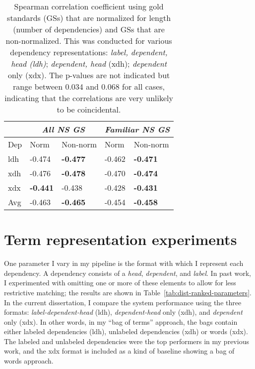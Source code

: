 \begin{table}[htb!]
\begin{center}
\begin{tabular}{|l||l|l||l|l|}
\hline
 & \multicolumn{2}{|c||}{\textit{All NS GS}} & \multicolumn{2}{|c|}{\textit{Familiar NS GS}} \\
\hline
 Dep & Norm & Non-norm & Norm & Non-norm \\
\hline
\hline
ldh & -0.474 & \textbf{-0.477} & -0.462 & \textbf{-0.471} \\
\hline
xdh & -0.476 & \textbf{-0.478} & -0.470 & \textbf{-0.474} \\
\hline
xdx & \textbf{-0.441} & -0.438 & -0.428 & \textbf{-0.431} \\
\hline
Avg & -0.463 & \textbf{-0.465} & -0.454 & \textbf{-0.458} \\
\hline
\end{tabular}
\caption{\label{tab:normalize-responses-spearman} Spearman correlation coefficient using gold standards (GSs) that are normalized for length (number of dependencies) and GSs that are non-normalized. This was conducted for various dependency representations: \textit{label, dependent, head (ldh)}; \textit{dependent, head} (xdh); \textit{dependent} only (xdx). The p-values are not indicated but range between 0.034 and 0.068 for all cases, indicating that the correlations are very unlikely to be coincidental.}
\end{center}
\end{table}




\section{Term representation experiments}
\label{sec:exp-term-reps}
One parameter I vary in my pipeline is the format with which I represent each dependency. A dependency consists of a \textit{head}, \textit{dependent}, and \textit{label}. In past work, I experimented with omitting one or more of these elements to allow for less restrictive matching; the results are shown in Table~\ref{tab:dist-ranked-parameters}. In the current dissertation, I compare the system performance using the three formats: \textit{label-dependent-head} (ldh), \textit{dependent-head} only (xdh), and \textit{dependent} only (xdx). In other words, in my ``bag of terms'' approach, the bags contain either labeled dependencies (ldh), unlabeled dependencies (xdh) or words (xdx). The labeled and unlabeled dependencies were the top performers in my previous work, and the xdx format is included as a kind of baseline showing a bag of words approach.

